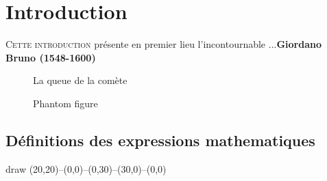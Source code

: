\documentclass[12pt,a4paper,twocolumn]{book} %
\title{\thispagestyle{fancy}\flushleft{\HAMA{0010111} GÉOMÉTROGRAPHIE avec  \LaTeX{}}}
\date{}
\author{Rémy Tomasetto}
\begin{document}
\maketitle









\chapter{Introduction}
\thispagestyle{fancy}
\lettrine{C}{ette introduction} présente en premier lieu l'incontournable ...\textbf{Giordano Bruno (1548-1600)}


\begin{figure}[t]
  \caption[La taille des planètes]{La queue de la comète\label{billetcomete}}
\end{figure}
\begin{figure}[ht]
  \centering
  \shadowbox{\phantom{\rule{4cm}{3cm}}}
  \caption{Phantom figure}
\end{figure}

\section{Définitions des expressions mathematiques}


\begin{mpinline}
  draw (20,20)--(0,0)--(0,30)--(30,0)--(0,0)
\end{mpinline}
\end{document}
